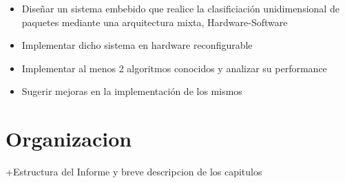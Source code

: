     \begin{itemize}     

     	\item Diseñar un sistema embebido que realice la clasificiación unidimensional de paquetes mediante una arquitectura mixta, Hardware-Software
	\item Implementar dicho sistema en hardware reconfigurable
	\item Implementar al menos 2 algoritmos conocidos y analizar su performance
	\item Sugerir mejoras en la implementación de los mismos   

\end{itemize}


\section{Organizacion}
+Estructura del Informe y breve descripcion de los capitulos





